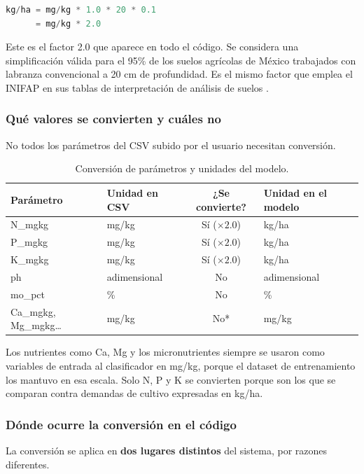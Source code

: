 \documentclass[12pt]{article}
\begin{document}
\begin{lstlisting}[language=Python]
kg/ha = mg/kg * 1.0 * 20 * 0.1
      = mg/kg * 2.0
\end{lstlisting}
Este es el factor 2.0 que aparece en todo el código. Se considera una simplificación válida para el 95\% de los suelos agrícolas de México trabajados con labranza convencional a 20 cm de profundidad. Es el mismo factor que emplea el INIFAP en sus tablas de interpretación de análisis de suelos \citep{inifap_2019}.

\subsubsection{Qué valores se convierten y cuáles no}
No todos los parámetros del CSV subido por el usuario necesitan conversión.

\begin{table}[htpb]
\centering
\caption{Conversión de parámetros y unidades del modelo.}
\label{tab:parametros_conversion}
\begin{tabular}{llcl}
\toprule
\textbf{Parámetro} & \textbf{Unidad en CSV} & \textbf{¿Se convierte?} & \textbf{Unidad en el modelo} \\
\midrule
N\_mgkg                 & mg/kg        & Sí ($\times 2.0$) & kg/ha        \\
P\_mgkg                 & mg/kg        & Sí ($\times 2.0$) & kg/ha        \\
K\_mgkg                 & mg/kg        & Sí ($\times 2.0$) & kg/ha        \\
ph                      & adimensional & No                & adimensional \\
mo\_pct                 & \%           & No                & \%           \\
Ca\_mgkg, Mg\_mgkg\dots & mg/kg        & No*               & mg/kg        \\
\bottomrule
\end{tabular}
\end{table}

Los nutrientes como Ca, Mg y los micronutrientes siempre se usaron como variables de entrada al clasificador en mg/kg, porque el dataset de entrenamiento los mantuvo en esa escala. Solo N, P y K se convierten porque son los que se comparan contra demandas de cultivo expresadas en kg/ha.

\subsubsection{Dónde ocurre la conversión en el código}
La conversión se aplica en \textbf{dos lugares distintos} del sistema, por razones diferentes.
\end{document}
